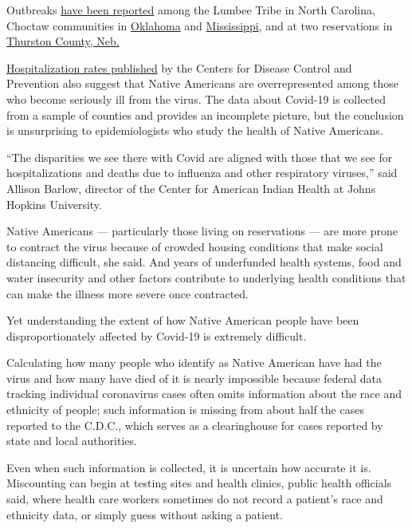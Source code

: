 Outbreaks
\href{https://www.wbtw.com/home/slowing-the-spread-lumbee-tribe-hosts-free-covid-19-testings/}{have
been reported} among the Lumbee Tribe in North Carolina, Choctaw
communities in
\href{https://oklahoman.com/article/5665246/mccurtain-countgy-sees-outbreaks-of-covid-19}{Oklahoma}
and
\href{https://www.clarionledger.com/story/news/2020/07/19/covid-toll-mississippi-band-choctaw-indians/5467655002/}{Mississippi},
and at two reservations in
\href{https://journalstar.com/news/state-and-regional/nebraska/covid-19-cases-increasing-on-omaha-winnebago-reservations/article_7da2cba1-4405-55aa-ab2b-69075aa42d40.html}{Thurston
County, Neb.}

\href{https://www.cdc.gov/coronavirus/2019-ncov/covid-data/covidview/index.html}{Hospitalization
rates published} by the Centers for Disease Control and Prevention also
suggest that Native Americans are overrepresented among those who become
seriously ill from the virus. The data about Covid-19 is collected from
a sample of counties and provides an incomplete picture, but the
conclusion is unsurprising to epidemiologists who study the health of
Native Americans.

``The disparities we see there with Covid are aligned with those that we
see for hospitalizations and deaths due to influenza and other
respiratory viruses,'' said Allison Barlow, director of the Center for
American Indian Health at Johns Hopkins University.

Native Americans --- particularly those living on reservations --- are
more prone to contract the virus because of crowded housing conditions
that make social distancing difficult, she said. And years of
underfunded health systems, food and water insecurity and other factors
contribute to underlying health conditions that can make the illness
more severe once contracted.

Yet understanding the extent of how Native American people have been
disproportionately affected by Covid-19 is extremely difficult.

Calculating how many people who identify as Native American have had the
virus and how many have died of it is nearly impossible because federal
data tracking individual coronavirus cases often omits information about
the race and ethnicity of people; such information is missing from about
half the cases reported to the C.D.C., which serves as a clearinghouse
for cases reported by state and local authorities.

Even when such information is collected, it is uncertain how accurate it
is. Miscounting can begin at testing sites and health clinics, public
health officials said, where health care workers sometimes do not record
a patient's race and ethnicity data, or simply guess without asking a
patient.

